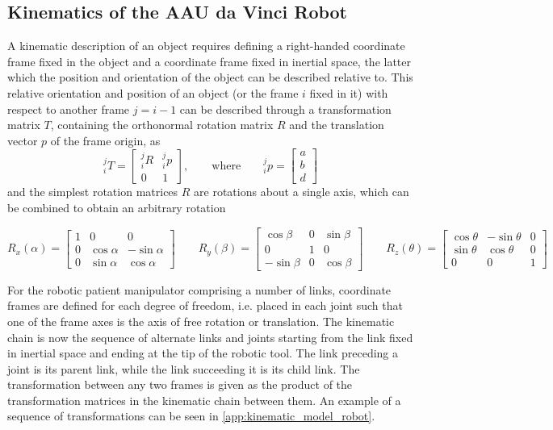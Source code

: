 \subsection{Kinematics of the AAU da Vinci Robot}
A kinematic description of an object requires defining a right-handed coordinate frame fixed in the object and a coordinate frame fixed in inertial space, the latter which the position and orientation of the object can be described relative to. This relative orientation and position of an object (or the frame $i$ fixed in it) with respect to another frame $j=i-1$ can be described through a transformation matrix $T$, containing the orthonormal rotation matrix $R$ and the translation vector $p$ of the frame origin, as 
\begin{equation}
^j_iT = 
\begin{bmatrix}
^j_iR & ^j_ip\\
0 & 1
\end{bmatrix}, \label{eq:kin_transformation}
\qquad \text{where} \qquad
^j_ip = 
\begin{bmatrix}
a\\b\\d
\end{bmatrix}
\end{equation}
and the simplest rotation matrices $R$ are rotations about a single axis, which can be combined to obtain an arbitrary rotation
\begin{small}
	\begin{equation}
	R_x(\alpha) = 
	\begin{bmatrix}
	1 & 0 & 0\\
	0 & \cos\alpha & -\sin\alpha\\
	0 & \sin\alpha & \cos\alpha
	\end{bmatrix} 
	\qquad
	R_y(\beta) = 
	\begin{bmatrix}
	\cos\beta & 0 & \sin\beta \\
	0 & 1 & 0\\
	-\sin\beta & 0 & \cos\beta
	\end{bmatrix}
	\qquad
	R_z(\theta) = 
	\begin{bmatrix}
	\cos\theta & -\sin\theta & 0\\
	\sin\theta & \cos\theta & 0\\
	0 & 0 & 1
	\end{bmatrix}
	\label{eq:RxRyRz_chapter}
	\end{equation}
\end{small}

For the robotic patient manipulator comprising a number of links, coordinate frames are defined for each degree of freedom, i.e. placed in each joint such that one of the frame axes is the axis of free rotation or translation. The kinematic chain is now the sequence of alternate links and joints starting from the link fixed in inertial space and ending at the tip of the robotic tool. The link preceding a joint is its parent link, while the link succeeding it is its child link. The transformation between any two frames is given as the product of the transformation matrices in the kinematic chain between them. An example of a sequence of transformations can be seen in \autoref{app:kinematic_model_robot}.

